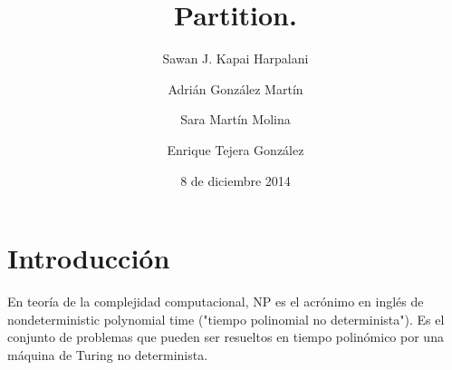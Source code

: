 \documentclass{article}
\title{\LARGE Partition.}
\author{Sawan J. Kapai Harpalani \and
	Adri\'an Gonz\'alez Mart\'in \and
	Sara Mart\'in Molina \and
	Enrique Tejera Gonz\'alez
}
\date{8 de diciembre 2014}
\begin{document}
\maketitle

\section{Introducci\'on}

En teor\'ia de la complejidad computacional, NP es el acr\'onimo en ingl\'es de
nondeterministic polynomial time ("tiempo polinomial no determinista"). 
Es el conjunto de problemas que pueden ser resueltos en tiempo polin\'omico 
por una m\'aquina de Turing no determinista.
\end{document}
